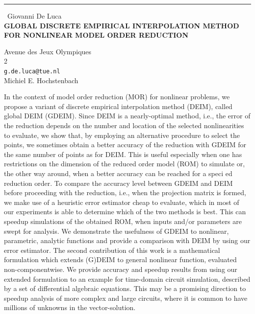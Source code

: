 \documentclass{report}
\begin{document}
\begin{center}
\rule{6in}{1pt} \
{\large Giovanni De Luca \\
{\bf GLOBAL DISCRETE EMPIRICAL INTERPOLATION METHOD FOR NONLINEAR MODEL ORDER REDUCTION}}

Avenue des Jeux Olympiques \\ 2
\\
{\tt g.de.luca@tue.nl}\\
Michiel E. Hochstenbach\end{center}

In the context of model order reduction (MOR) for nonlinear problems, we
propose a variant of discrete empirical interpolation method (DEIM),
called global DEIM (GDEIM). Since DEIM is a nearly-optimal method, i.e.,
the error of the reduction depends on the number and location of the
selected nonlinearities to evaluate, we show that, by employing an
alternative procedure to select the points, we sometimes obtain a better
accuracy of the reduction with GDEIM for the same number of points as for
DEIM. This is useful especially when one has restrictions on the
dimension of the reduced order model (ROM) to simulate or, the other way
around, when a better accuracy can be reached for a speci ed reduction
order. To compare the accuracy level between GDEIM and DEIM before
proceeding with the reduction, i.e., when the projection matrix is
formed, we make use of a heuristic error estimator cheap to evaluate,
which in most of our experiments is able to determine which of the two
methods is best. This can speedup simulations of the obtained ROM, when
inputs and/or parameters are swept for analysis. We demonstrate the
usefulness of GDEIM to nonlinear, parametric, analytic functions and
provide a comparison with DEIM by using our error estimator.
The second contribution of this work is a mathematical formulation which
extends (G)DEIM to general nonlinear function, evaluated
non-componentwise. We provide accuracy and speedup results from using our
extended formulation to an example for time-domain circuit simulation,
described by a set of differential algebraic equations. This may be a
promising direction to speedup analysis of more complex and large
circuits, where it is common to have millions of unknowns in the
vector-solution.
\end{document}
